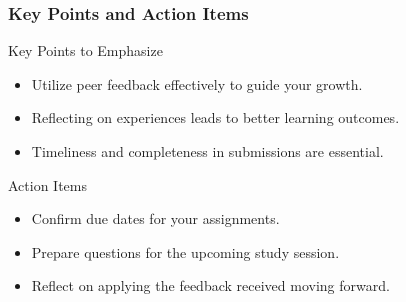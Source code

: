 \documentclass[aspectratio=169]{beamer}
\begin{document}
\begin{frame}[fragile]
    \frametitle{Key Points and Action Items}

    \begin{block}{Key Points to Emphasize}
        \begin{itemize}
            \item Utilize peer feedback effectively to guide your growth.
            \item Reflecting on experiences leads to better learning outcomes.
            \item Timeliness and completeness in submissions are essential.
        \end{itemize}
    \end{block}

    \begin{block}{Action Items}
        \begin{itemize}
            \item Confirm due dates for your assignments.
            \item Prepare questions for the upcoming study session.
            \item Reflect on applying the feedback received moving forward.
        \end{itemize}
    \end{block}
\end{frame}
\end{document}
